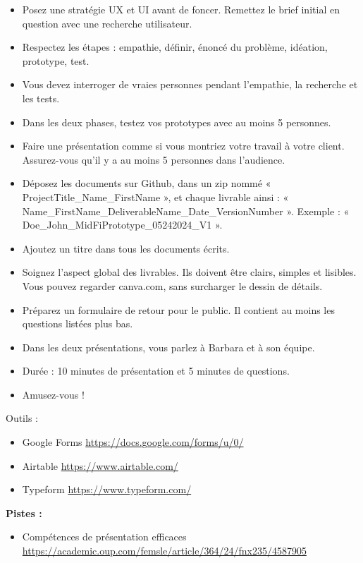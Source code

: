 \begin{itemize}
\item Posez une stratégie UX et UI avant de foncer. Remettez le brief initial en question avec une recherche utilisateur.
\item Respectez les étapes : empathie, définir, énoncé du problème, idéation, prototype, test.
\item Vous devez interroger de vraies personnes pendant l'empathie, la recherche et les tests.
\item Dans les deux phases, testez vos prototypes avec au moins 5 personnes.
\item Faire une présentation comme si vous montriez votre travail à votre client. Assurez-vous qu'il y a au moins 5 personnes dans l'audience.
\item Déposez les documents sur Github, dans un zip nommé « ProjectTitle\_Name\_FirstName », et chaque livrable ainsi : « Name\_FirstName\_DeliverableName\_Date\_VersionNumber ». Exemple : « Doe\_John\_MidFiPrototype\_05242024\_V1 ».
\item Ajoutez un titre dans tous les documents écrits.
\item Soignez l'aspect global des livrables. Ils doivent être clairs, simples et lisibles. Vous pouvez regarder canva.com, sans surcharger le dessin de détails.
\item Préparez un formulaire de retour pour le public. Il contient au moins les questions listées plus bas.
\item Dans les deux présentations, vous parlez à Barbara et à son équipe.
\item Durée : 10 minutes de présentation et 5 minutes de questions.
\item Amusez-vous !
\end{itemize}

Outils :

\begin{itemize}
\item Google Forms \url{https://docs.google.com/forms/u/0/}
\item Airtable \url{https://www.airtable.com/}
\item Typeform \url{https://www.typeform.com/}
\end{itemize}

\textbf{Pistes :}

\begin{itemize}
\item Compétences de présentation efficaces \url{https://academic.oup.com/femsle/article/364/24/fnx235/4587905}
\end{itemize}

